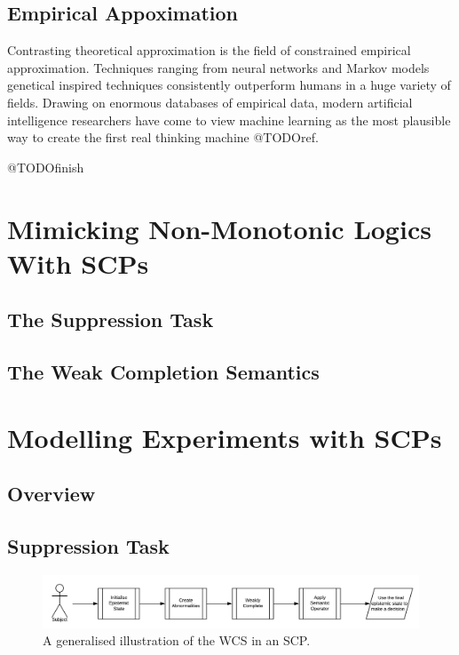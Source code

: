 \documentclass[
11pt, %
english, %
singlespacing, %
headsepline, %
]{MastersDoctoralThesis} %
\begin{document}
\section{Empirical Appoximation}
Contrasting theoretical approximation is the field of constrained empirical approximation. Techniques ranging from neural networks and Markov models genetical inspired techniques consistently outperform humans in a huge variety of fields. Drawing on enormous databases of empirical data, modern artificial intelligence researchers have come to view machine learning as the most plausible way to create the first real thinking machine @TODOref.

@TODOfinish

\chapter{Mimicking Non-Monotonic Logics With SCPs}

\section{The Suppression Task}

\section{The Weak Completion Semantics}



\chapter{Modelling Experiments with SCPs}
\section{Overview}
\section{Suppression Task}

\begin{figure}
\begin{center}
 \centering \includegraphics[width=\linewidth]{suppressionSCP_overview}
\caption{A generalised illustration of the WCS in an SCP. }
\label {fig:supoverview}
\end{center}
\end{figure}
\end{document}
